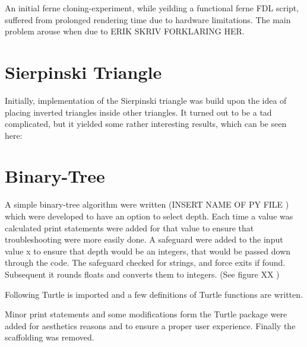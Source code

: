 \documentclass[titlepage]{article}
\begin{document}
An initial ferne cloning-experiment, while yeilding a functional ferne FDL script, suffered from prolonged rendering time due to hardware limitations. The main problem arouse when due to ERIK SKRIV FORKLARING HER.
\section{Sierpinski Triangle}
Initially, implementation of the Sierpinski triangle was build upon the idea of placing inverted triangles inside other triangles. It turned out to be a tad complicated, but it yielded some rather interesting results, which can be seen here:
\section{Binary-Tree}
A simple binary-tree algorithm were written (INSERT NAME OF PY FILE ) which were developed to have an option to select depth. Each time a value was calculated print statements were added for that value to ensure that troubleshooting were more easily done.  A safeguard were added to the input value x to ensure that depth would be an integers, that would be passed down through the code. The safeguard checked for strings, and force exits if found. Subsequent it rounds floats and converts them to integers. (See figure XX )

Following Turtle is imported and a few definitions of Turtle functions are written. 

Minor print statements and some modifications form the Turtle package were added for aesthetics reasons and to ensure a proper user experience.  Finally the scaffolding was removed. 
\end{document}
